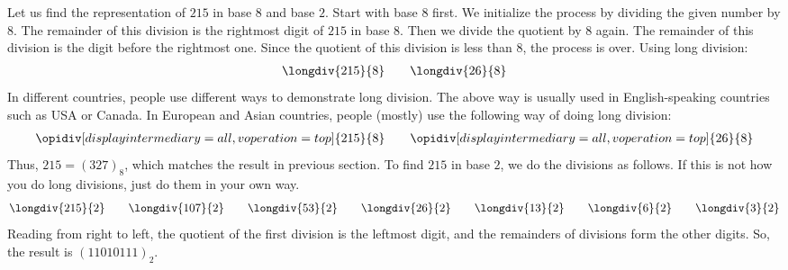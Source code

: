 \documentclass{subfile}
\begin{document}
	\begin{example}
		Let us find the representation of $215$ in base $8$ and base $2$. Start with base $8$ first. We initialize the process by dividing the given number by $8$. The remainder of this division is the rightmost digit of $215$ in base $8$. Then we divide the quotient by $8$ again. The remainder of this division is the digit before the rightmost one. Since the quotient of this division is less than $8$, the process is over. Using long division:
			\begin{align*}
				\longdiv{215}{8}
				\qquad
				\longdiv{26}{8}
			\end{align*}
		In different countries, people use different ways to demonstrate long division. The above way is usually used in English-speaking countries such as USA or Canada. In European and Asian countries, people (mostly) use the following way of doing long division:
			\begin{align*}
				\opidiv[displayintermediary=all,voperation=top]{215}{8}
				\qquad
				\opidiv[displayintermediary=all,voperation=top]{26}{8}
			\end{align*}
		Thus, $215=(327)_8$, which matches the result in previous section. To find $215$ in base $2$, we do the divisions as follows. If this is not how you do long divisions, just do them in your own way.
		\begin{align*}
			\longdiv{215}{2}
			\qquad
			\longdiv{107}{2}
			\qquad
			\longdiv{53}{2}
			\qquad
			\longdiv{26}{2}
			\qquad
			\longdiv{13}{2}
			\qquad
			\longdiv{6}{2}
			\qquad
			\longdiv{3}{2}
		\end{align*}
		Reading from right to left, the quotient of the first division is the leftmost digit, and the remainders of divisions form the other digits. So, the result is $(11010111)_2$.
	\end{example}
\end{document}
